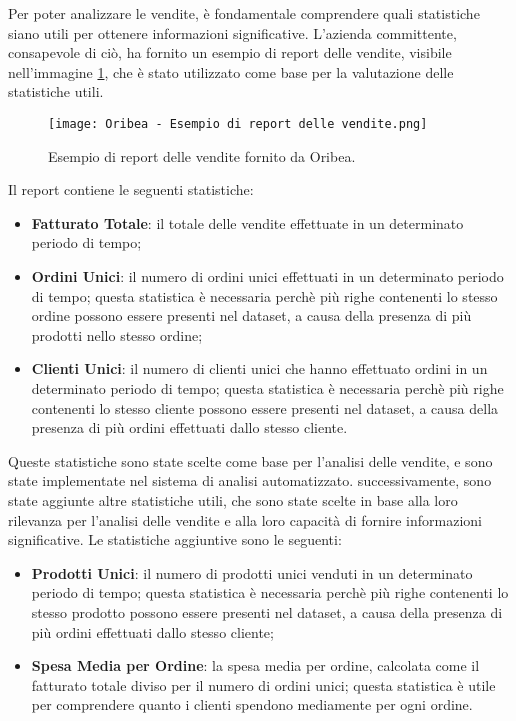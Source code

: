 Per poter analizzare le vendite, è fondamentale comprendere quali statistiche siano utili per ottenere informazioni significative. L'azienda committente, consapevole di ciò, ha fornito un esempio di report delle vendite, visibile nell'immagine \ref{fig:oribea-report-example}, che è stato utilizzato come base per la valutazione delle statistiche utili.

\begin{figure}[!h] 
    \centering 
    \texttt{[image: Oribea - Esempio di report delle vendite.png]}
    \caption{Esempio di report delle vendite fornito da Oribea.}
    \label{fig:oribea-report-example}
\end{figure}

Il report contiene le seguenti statistiche:
\begin{itemize}
    \item \textbf{Fatturato Totale}: il totale delle vendite effettuate in un determinato periodo di tempo;
    \item \textbf{Ordini Unici}: il numero di ordini unici effettuati in un determinato periodo di tempo; questa statistica è necessaria perchè più righe contenenti lo stesso ordine possono essere presenti nel dataset, a causa della presenza di più prodotti nello stesso ordine;
    \item \textbf{Clienti Unici}: il numero di clienti unici che hanno effettuato ordini in un determinato periodo di tempo; questa statistica è necessaria perchè più righe contenenti lo stesso cliente possono essere presenti nel dataset, a causa della presenza di più ordini effettuati dallo stesso cliente.
\end{itemize}

Queste statistiche sono state scelte come base per l'analisi delle vendite, e sono state implementate nel sistema di analisi automatizzato. successivamente, sono state aggiunte altre statistiche utili, che sono state scelte in base alla loro rilevanza per l'analisi delle vendite e alla loro capacità di fornire informazioni significative. Le statistiche aggiuntive sono le seguenti:
\begin{itemize}
    \item \textbf{Prodotti Unici}: il numero di prodotti unici venduti in un determinato periodo di tempo; questa statistica è necessaria perchè più righe contenenti lo stesso prodotto possono essere presenti nel dataset, a causa della presenza di più ordini effettuati dallo stesso cliente;
    \item \textbf{Spesa Media per Ordine}: la spesa media per ordine, calcolata come il fatturato totale diviso per il numero di ordini unici; questa statistica è utile per comprendere quanto i clienti spendono mediamente per ogni ordine.
\end{itemize}

